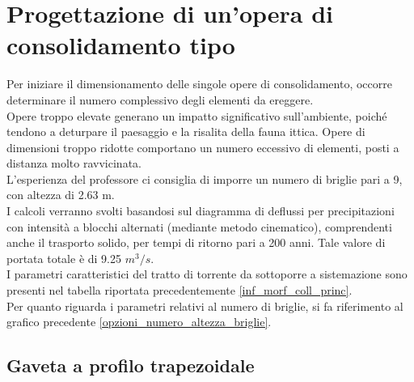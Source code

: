 \section{Progettazione di un'opera di consolidamento tipo}
Per iniziare il dimensionamento delle singole opere di consolidamento, occorre determinare il numero complessivo degli elementi da ereggere.\\
Opere troppo elevate generano un impatto significativo sull'ambiente, poiché tendono a deturpare il paesaggio e la risalita della fauna ittica. Opere di dimensioni troppo ridotte comportano un numero eccessivo di elementi, posti a distanza molto ravvicinata.\\
L'esperienza del professore ci consiglia di imporre un numero di briglie pari a 9, con altezza di 2.63 m.\\
I calcoli verranno svolti basandosi sul diagramma di deflussi per precipitazioni con intensità a blocchi alternati (mediante metodo cinematico), comprendenti anche il trasporto solido, per tempi di ritorno pari a 200 anni. Tale valore di portata totale è di 9.25 $m^3/s$.\\
I parametri caratteristici del tratto di torrente da sottoporre a sistemazione sono presenti nel tabella riportata precedentemente \ref{inf_morf_coll_princ}.\\
Per quanto riguarda i parametri relativi al numero di briglie, si fa riferimento al grafico precedente \ref{opzioni_numero_altezza_briglie}.
\subsection{Gaveta a profilo trapezoidale}

